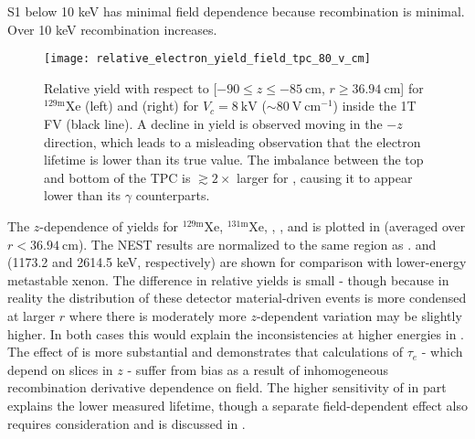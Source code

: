 S1 below 10 keV has minimal field dependence because recombination is minimal.  Over 10 keV recombination increases.

\begin{figure}
\centering
\texttt{[image: relative\_electron\_yield\_field\_tpc\_80\_v\_cm]}
\caption{Relative \electron yield with respect to [$-90 \leq z \leq -85\ \mathrm{cm}$, $r \geq 36.94\ \mathrm{cm}$] for
$\mathrm{^{129m}Xe}$ (left) and  (right) for $V_c = 8\ \mathrm{kV}$ (${\sim}80\ \mathrm{V\ cm^{-1}}$) inside the 1T FV (black
line).  A decline in yield is
observed moving in the $-z$ direction, which leads to a misleading observation that the electron lifetime is lower than its true
value.  The imbalance between the top
and bottom of the TPC is $\gtrsim 2\times$ larger for , causing it to appear lower than its $\gamma$ counterparts.}
\label{fig:electron_lifetimes_rn222_vs_kr83m_field_tpc}
\end{figure}

The $z$-dependence of \electron yields for $\mathrm{^{129m}Xe}$, $\mathrm{^{131m}Xe}$, , , and  is
plotted in  (averaged over $r < 36.94\ \mathrm{cm}$).  The NEST results are
normalized to the same region as .   and  (1173.2 and
2614.5 keV, respectively) are shown for comparison with lower-energy metastable xenon.  The difference in relative yields is
small - though because in reality the distribution of these detector material-driven events is more condensed at larger $r$ where there
is moderately more $z$-dependent variation may be slightly higher.  In both cases this
would explain the inconsistencies at higher energies in .  The
effect of  is more substantial and demonstrates that calculations of $\tau_e$ - which depend on slices in $z$ - suffer from
bias as a result of inhomogeneous recombination derivative dependence on field.  The higher sensitivity of \alphadecays in part explains
the lower measured lifetime, though a separate field-dependent effect also requires consideration and is discussed in
.

